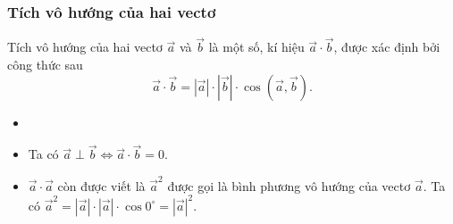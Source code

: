 \subsubsection{Tích vô hướng của hai vectơ}
	Tích vô hướng của hai vectơ $\overrightarrow{a}$ và $\overrightarrow{b}$	là một số, kí hiệu $\overrightarrow{a}\cdot \overrightarrow{b}$, được xác định bởi công thức sau
	$$\overrightarrow{a} \cdot \overrightarrow{b} = \left|\overrightarrow{a}\right|\cdot \left|\overrightarrow{b}\right|\cdot \cos \left(\overrightarrow{a}, \overrightarrow{b}\right).$$

\begin{note}
	\begin{itemize}
		\item []
		\item Ta có $\overrightarrow{a} \perp \overrightarrow{b} \Leftrightarrow \overrightarrow{a} \cdot \overrightarrow{b} = 0$.
		\item $\overrightarrow{a}\cdot \overrightarrow{a}$ còn được viết là $\overrightarrow{a}^2$ được gọi là bình phương vô hướng của vectơ $\overrightarrow{a}$. Ta có $\overrightarrow{a}^2 = |\overrightarrow{a}|\cdot |\overrightarrow{a}|\cdot \cos 0^\circ = |\overrightarrow{a}|^2$.
	\end{itemize}
\end{note}
